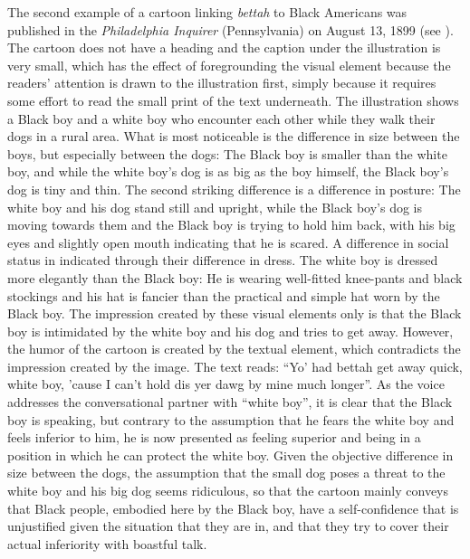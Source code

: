 The second example of a cartoon linking \emph{bettah} to Black Americans was published in the \emph{Philadelphia Inquirer} (Pennsylvania) on August 13, 1899 (see ). The cartoon does not have a heading and the caption under the illustration is very small, which has the effect of foregrounding the visual element because the readers’ attention is drawn to the illustration first, simply because it requires some effort to read the small print of the text underneath. The illustration shows a Black boy and a white boy who encounter each other while they walk their dogs in a rural area. What is most noticeable is the difference in size between the boys, but especially between the dogs: The Black boy is smaller than the white boy, and while the white boy’s dog is as big as the boy himself, the Black boy’s dog is tiny and thin. The second striking difference is a difference in posture: The white boy and his dog stand still and upright, while the Black boy’s dog is moving towards them and the Black boy is trying to hold him back, with his big eyes and slightly open mouth indicating that he is scared. A difference in social status in indicated through their difference in dress. The white boy is dressed more elegantly than the Black boy: He is wearing well-fitted knee-pants and black stockings and his hat is fancier than the practical and simple hat worn by the Black boy. The impression created by these visual elements only is that the Black boy is intimidated by the white boy and his dog and tries to get away. However, the humor of the cartoon is created by the textual element, which contradicts the impression created by the image. The text reads: “Yo’ had bettah get away quick, white boy, ’cause I can’t hold dis yer dawg by mine much longer”. As the voice addresses the conversational partner with “white boy”, it is clear that the Black boy is speaking, but contrary to the assumption that he fears the white boy and feels inferior to him, he is now presented as feeling superior and being in a position in which he can protect the white boy. Given the objective difference in size between the dogs, the assumption that the small dog poses a threat to the white boy and his big dog seems ridiculous, so that the cartoon mainly conveys that Black people, embodied here by the Black boy, have a self-confidence that is unjustified given the situation that they are in, and that they try to cover their actual inferiority with boastful talk.


